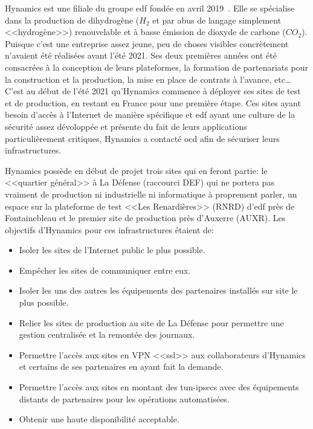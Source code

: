 \documentclass[12pt, oneside, a4paper, titlepage]{report}
\begin{document}
Hynamics est une filiale du groupe \gls{edf} fondée en avril 2019~\cite{hy}.
Elle se spécialise dans la production de dihydrogène ($H_2$ et par abus de
langage simplement <<hydrogène>>) renouvelable et à basse émission de dioxyde de
carbone ($CO_2$). Puisque c'est une entreprise assez jeune, peu de choses
visibles concrètement n'avaient été réalisées avant l'été 2021. Ses deux
premières années ont été consacrées à la conception de leurs plateformes, la
formation de partenariats pour la construction et la production, la mise en
place de contrats à l'avance, etc\ldots{} C'est au début de l'été 2021
qu'Hynamics commence à déployer ses sites de test et de production, en restant
en France pour une première étape. Ces sites ayant besoin d'accès à l'Internet
de manière spécifique et \gls{edf} ayant une culture de la sécurité assez
dévoloppée et présente du fait de leurs applications particulièrement critiques,
Hynamics a contacté \acrlong{ocd} afin de sécuriser leurs infrastructures.

Hynamics possède en début de projet trois sites qui en feront partie: le
<<quartier général>> à La Défense (raccourci DEF) qui ne portera pas vraiment de
production ni industrielle ni informatique à proprement parler, un espace sur la
plateforme de test <<Les Renardières>> (RNRD) d'\gls{edf} près de Fontainebleau
et le premier site de production près d'Auxerre (AUXR). Les objectifs d'Hynamics
pour ces infrastructures étaient de:

\begin{itemize}
    \item Isoler les sites de l'Internet public le plus possible.
    \item Empêcher les sites de communiquer entre eux.
    \item Isoler les uns des autres les équipements des partenaires installés
        sur site le plus possible.
    \item Relier les sites de production au site de La Défense pour permettre
        une gestion centralisée et la remontée des journaux.
    \item Permettre l'accès aux sites en VPN <<\gls{ssl}>> aux collaborateurs
        d'Hynamics et certains de ses partenaires en ayant fait la demande.
    \item Permettre l'accès aux sites en montant des \glspl{tun-ipsec} avec des
        équipements distants de partenaires pour les opérations automatisées.
    \item Obtenir une haute disponibilité acceptable.
\end{itemize}
\end{document}
